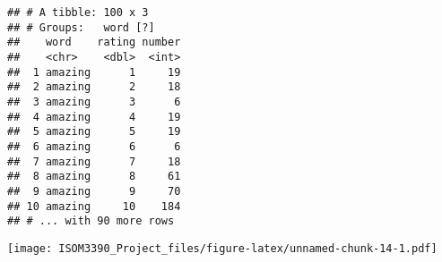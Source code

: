 \documentclass[]{article}
\newenvironment{Shaded}{\begin{snugshade}}{\end{snugshade}}
\newcommand{\KeywordTok}[1]{\textcolor[rgb]{0.13,0.29,0.53}{\textbf{#1}}}
\newcommand{\DataTypeTok}[1]{\textcolor[rgb]{0.13,0.29,0.53}{#1}}
\newcommand{\DecValTok}[1]{\textcolor[rgb]{0.00,0.00,0.81}{#1}}
\newcommand{\StringTok}[1]{\textcolor[rgb]{0.31,0.60,0.02}{#1}}
\newcommand{\OperatorTok}[1]{\textcolor[rgb]{0.81,0.36,0.00}{\textbf{#1}}}
\newcommand{\NormalTok}[1]{#1}
\begin{document}
\begin{verbatim}
## # A tibble: 100 x 3
## # Groups:   word [?]
##    word    rating number
##    <chr>    <dbl>  <int>
##  1 amazing      1     19
##  2 amazing      2     18
##  3 amazing      3      6
##  4 amazing      4     19
##  5 amazing      5     19
##  6 amazing      6      6
##  7 amazing      7     18
##  8 amazing      8     61
##  9 amazing      9     70
## 10 amazing     10    184
## # ... with 90 more rows
\end{verbatim}

\begin{Shaded}
\end{Shaded}

\texttt{[image: ISOM3390\_Project\_files/figure-latex/unnamed-chunk-14-1.pdf]}
\end{document}
